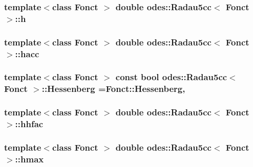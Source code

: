 \hypertarget{classodes_1_1Radau5cc_afa3dc089844e77046c958a4ff2dcab1a}{
\subsubsection[{h}]{\setlength{\rightskip}{0pt plus 5cm}template$<$class Fonct $>$ double {\bf odes\-::\-Radau5cc}$<$ Fonct $>$\-::h\hspace{0.3cm}{\ttfamily [private]}}}\label{classodes_1_1Radau5cc_afa3dc089844e77046c958a4ff2dcab1a}
\hypertarget{classodes_1_1Radau5cc_a868b61b5db9d458fd554f004ca366a52}{
\subsubsection[{hacc}]{\setlength{\rightskip}{0pt plus 5cm}template$<$class Fonct $>$ double {\bf odes\-::\-Radau5cc}$<$ Fonct $>$\-::hacc\hspace{0.3cm}{\ttfamily [private]}}}\label{classodes_1_1Radau5cc_a868b61b5db9d458fd554f004ca366a52}
\hypertarget{classodes_1_1Radau5cc_ae66683695f55d21d7c11ca7e3323d0e9}{
\subsubsection[{Hessenberg}]{\setlength{\rightskip}{0pt plus 5cm}template$<$class Fonct $>$ const bool {\bf odes\-::\-Radau5cc}$<$ Fonct $>$\-::Hessenberg =Fonct\-::\-Hessenberg\hspace{0.3cm}{\ttfamily [static]}, {\ttfamily [private]}}}\label{classodes_1_1Radau5cc_ae66683695f55d21d7c11ca7e3323d0e9}
\hypertarget{classodes_1_1Radau5cc_ad853d1040e37757aad020edde3b2ec28}{
\subsubsection[{hhfac}]{\setlength{\rightskip}{0pt plus 5cm}template$<$class Fonct $>$ double {\bf odes\-::\-Radau5cc}$<$ Fonct $>$\-::hhfac\hspace{0.3cm}{\ttfamily [private]}}}\label{classodes_1_1Radau5cc_ad853d1040e37757aad020edde3b2ec28}
\hypertarget{classodes_1_1Radau5cc_a73d88dc2c07d7e200a1c03dae8caa7f4}{
\subsubsection[{hmax}]{\setlength{\rightskip}{0pt plus 5cm}template$<$class Fonct $>$ double {\bf odes\-::\-Radau5cc}$<$ Fonct $>$\-::hmax\hspace{0.3cm}{\ttfamily [private]}}}\label{classodes_1_1Radau5cc_a73d88dc2c07d7e200a1c03dae8caa7f4}

